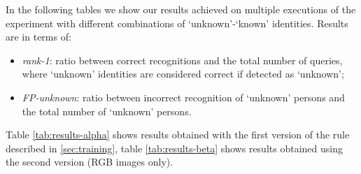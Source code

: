 \documentclass{article}
\begin{document}
In the following tables we show our results achieved on multiple executions of the experiment with different combinations of `unknown'-`known' identities. Results are in terms of:
\begin{itemize}
	\item \textit{rank-1}: ratio between correct recognitions and the total number of queries, where `unknown' identities are considered correct if detected as `unknown';
	\item \textit{FP-unknown}: ratio between incorrect recognition of `unknown' persons and the total number of `unknown' persons.
\end{itemize}
Table \ref{tab:results-alpha} shows results obtained with the first version of the rule described in \ref{sec:training}, table \ref{tab:results-beta} shows results obtained using the second version (RGB images only).
\end{document}
